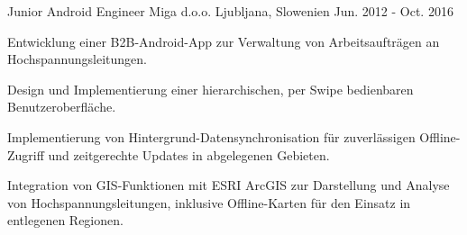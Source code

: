 \begin{cventries}
  \cventry
    {Junior Android Engineer} %
    {Miga d.o.o.} %
    {Ljubljana, Slowenien} %
    {Jun. 2012 - Oct. 2016} %
    {
      \begin{cvitems} %
        \item {Entwicklung einer B2B-Android-App zur Verwaltung von Arbeitsaufträgen an Hochspannungsleitungen.}
        \item {Design und Implementierung einer hierarchischen, per Swipe bedienbaren Benutzeroberfläche.}
        \item {Implementierung von Hintergrund-Datensynchronisation für zuverlässigen Offline-Zugriff und zeitgerechte Updates in abgelegenen Gebieten.}
        \item {Integration von GIS-Funktionen mit ESRI ArcGIS zur Darstellung und Analyse von Hochspannungsleitungen, inklusive Offline-Karten für den Einsatz in entlegenen Regionen.}
      \end{cvitems}
    }

\end{cventries}
